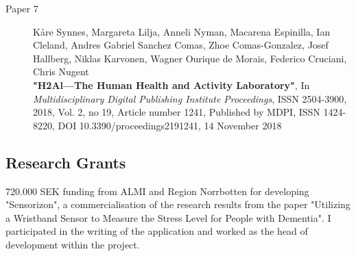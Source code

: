 \documentclass{article}
\begin{document}
\begin{description}
\item[Paper 7]
Kåre Synnes, Margareta Lilja, Anneli Nyman, Macarena Espinilla, Ian Cleland, Andres Gabriel Sanchez Comas, Zhoe Comas-Gonzalez, Josef Hallberg, Niklas Karvonen, Wagner Ourique de Morais, Federico Cruciani, Chris Nugent\\
{\bf "H2Al—The Human Health and Activity Laboratory"}, 
In {\it Multidisciplinary Digital Publishing Institute Proceedings}, ISSN 2504-3900, 2018, Vol. 2, no 19, Article number 1241,
Published by MDPI, ISSN 1424-8220,
DOI 10.3390/proceedings2191241,
14 November 2018
\end{description}

\subsection{Research Grants}
720.000 SEK funding from ALMI and Region Norrbotten for developing "Sensorizon", a commercialisation of the research results from the paper "Utilizing a Wristband Sensor to Measure the Stress Level for People with Dementia". I participated in the writing of the application and worked as the head of development within the project.



\newpage

\end{document}
